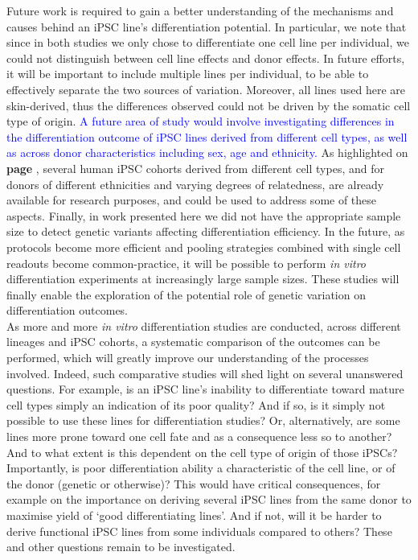 Future work is required to gain a better understanding of the mechanisms and causes behind an iPSC line's differentiation potential.
In particular, we note that since in both studies we only chose to differentiate one cell line per individual, we could not distinguish between cell line effects and donor effects.
In future efforts, it will be important to include multiple lines per individual, to be able to effectively separate the two sources of variation.
Moreover, all lines used here are skin-derived, thus the differences observed could not be driven by the somatic cell type of origin.
\textcolor{blue}{A future area of study would involve investigating differences in the differentiation outcome of iPSC lines derived from different cell types, as well as across donor characteristics including sex, age and ethnicity.}
As highlighted on \textbf{page \pageref{sec:HipSci}}, several human iPSC cohorts derived from different cell types, and for donors of different ethnicities and varying degrees of relatedness, are already available for research purposes, and could be used to address some of these aspects.
Finally, in work presented here we did not have the appropriate sample size to detect genetic variants affecting differentiation efficiency.
In the future, as protocols become more efficient and pooling strategies combined with single cell readouts become common-practice, it will be possible to perform \textit{in vitro} differentiation experiments at increasingly large sample sizes.
These studies will finally enable the exploration of the potential role of genetic variation on differentiation outcomes. \\

As more and more \textit{in vitro} differentiation studies are conducted, across different lineages and iPSC cohorts, a systematic comparison of the outcomes can be performed, which will greatly improve our understanding of the processes involved.
Indeed, such comparative studies will shed light on several unanswered questions.
For example, is an iPSC line's inability to differentiate toward mature cell types simply an indication of its poor quality?
And if so, is it simply not possible to use these lines for differentiation studies?
Or, alternatively, are some lines more prone toward one cell fate and as a consequence less so to another?
And to what extent is this dependent on the cell type of origin of those iPSCs?
Importantly, is poor differentiation ability a characteristic of the cell line, or of the donor (genetic or otherwise)?
This would have critical consequences, for example on the importance on deriving several iPSC lines from the same donor to maximise yield of `good differentiating lines'.
And if not, will it be harder to derive functional iPSC lines from some individuals compared to others?
These and other questions remain to be investigated.

